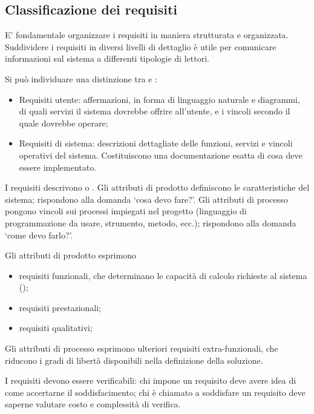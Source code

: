 \subsection{Classificazione dei requisiti}
E' fondamentale organizzare i requisiti in maniera strutturata e organizzata.
Suddividere i requisiti in diversi livelli di dettaglio è utile per comunicare
informazioni sul sistema a differenti tipologie di lettori.

Si può individuare una distinzione tra  e
:
\begin{itemize}
  \item Requisiti utente: affermazioni, in forma di linguaggio naturale e
        diagrammi, di quali servizi il sistema dovrebbe offrire all'utente, e i
        vincoli secondo il quale dovrebbe operare;
\item Requisiti di sistema: descrizioni dettagliate delle funzioni, servizi e
      vincoli operativi del sistema. Costituiscono una documentazione esatta di
      cosa deve essere implementato.
\end{itemize}

I requisiti descrivono  o . Gli attributi di prodotto definiscono le caratteristiche del sistema;
rispondono alla domanda `cosa devo fare?'. Gli attributi di processo pongono
vincoli sui processi impiegati nel progetto (linguaggio di programmazione da
usare, strumento, metodo, ecc.); rispondono alla domanda `come devo farlo?'.

Gli attributi di prodotto esprimono
\begin{itemize}
  \item requisiti funzionali, che determinano le capacità di calcolo richieste
  al sistema ();
  \item requisiti prestazionali;
  \item requisiti qualitativi;
\end{itemize}

Gli attributi di processo esprimono ulteriori requisiti extra-funzionali, che
riducono i gradi di libertà disponibili nella definizione della soluzione.

I requisiti devono essere verificabili: chi impone un requisito deve avere idea
di come accertarne il soddisfacimento; chi è chiamato a soddisfare un requisito
deve saperne valutare costo e complessità di verifica.

